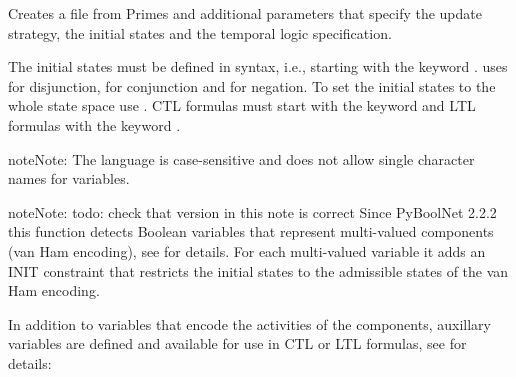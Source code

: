 \documentclass[letterpaper,10pt,english]{sphinxmanual}
\begin{document}
\begin{fulllineitems}
\label{\detokenize{ModelChecking:PyBoolNet.ModelChecking.primes2smv}}
Creates a  file from Primes and additional parameters that specify the update strategy, the initial states and the temporal logic specification.

The initial states must be defined in {\hyperref[\detokenize{Installation:installation-nusmv}]{}} syntax, i.e.,
starting with the keyword .
{\hyperref[\detokenize{Installation:installation-nusmv}]{}} uses \sphinxstyleemphasis{\textbar{}} for disjunction, \sphinxstyleemphasis{\&} for conjunction and \sphinxstyleemphasis{!} for negation.
To set the initial states to the whole state space use .
CTL formulas must start with the keyword  and LTL formulas with the keyword .

\begin{sphinxadmonition}{note}{Note:}
The {\hyperref[\detokenize{Installation:installation-nusmv}]{}} language is case-sensitive and does not allow single character names for variables.
\end{sphinxadmonition}

\begin{sphinxadmonition}{note}{Note:}
todo: check that version in this note is correct
Since PyBoolNet 2.2.2 this function detects Boolean variables that represent multi-valued components (van Ham encoding), see {\hyperref[\detokenize{StateTransitionGraphs:find-vanham-variables}]{}} for details.
For each multi-valued variable it adds an INIT constraint that restricts the initial states to the admissible states of the van Ham encoding.
\end{sphinxadmonition}

In addition to variables that encode the activities of the components,
auxillary variables are defined and available for use in CTL or LTL formulas,
see {\hyperref[\detokenize{Manual:sec-model-checking}]{}} for details:


\end{fulllineitems}
\end{document}
